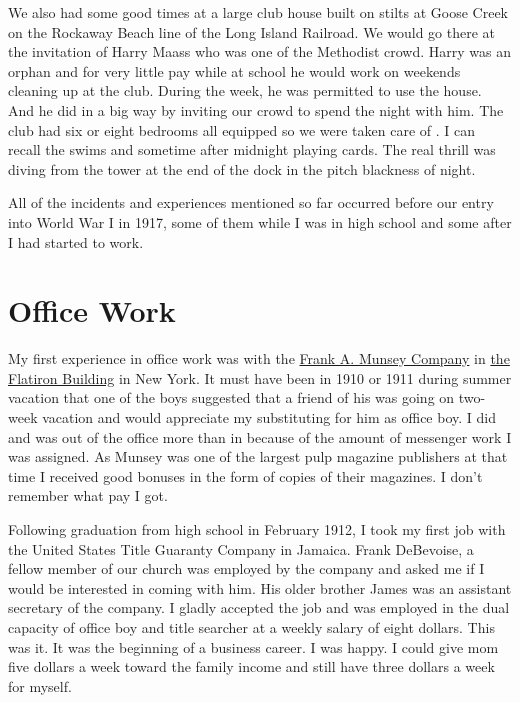 \documentclass[12pt]{book}              %
\begin{document}
We also had some good times at a large club house built on stilts at Goose Creek on the Rockaway Beach line of the Long Island Railroad. We would go there at the invitation of Harry Maass who was one of the Methodist crowd. Harry was an orphan and for very little pay while at school he would work on weekends cleaning up at the club. During the week, he was permitted to use the house. And he did in a big way by inviting our crowd to spend the night with him. The club had six or eight bedrooms all equipped so we were taken care of . I can recall the swims and sometime after midnight playing cards. The real thrill was diving from the tower at the end of the dock in the pitch blackness of night. 

All of the incidents and experiences mentioned so far occurred before our entry into World War I in 1917, some of them while I was in high school and some after I had started to work.

\chapter{Office Work}

My first experience in office work was with the \href{http://en.wikipedia.org/wiki/Frank_Munsey}{Frank A. Munsey Company} in \href{http://en.wikipedia.org/wiki/Flatiron_Building}{the Flatiron Building} in New York. It must have been in 1910 or 1911 during summer vacation that one of the boys suggested that a friend of his was going on two-week vacation and would appreciate my substituting for him as office boy. I did and was out of the office more than in because of the amount of messenger work I was assigned. As Munsey was one of the largest pulp magazine publishers at that time I received good bonuses in the form of copies of their magazines. I don't remember what pay I got. 


Following graduation from high school in February 1912, I took my first job with the United States Title Guaranty Company in Jamaica. Frank DeBevoise, a fellow member of our church was employed by the company and asked me if I would be interested in coming with him. His older brother James was an assistant secretary of the company. I gladly accepted the job and was employed in the dual capacity of office boy and title searcher at a weekly salary of eight dollars. This was it. It was the beginning of a business career. I was happy. I could give mom five dollars a week toward the family income and still have three dollars a week for myself.
\end{document}
